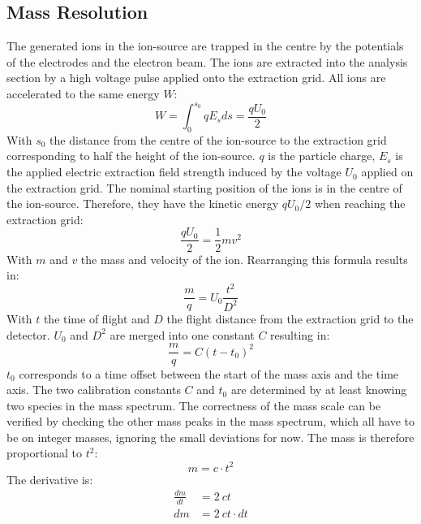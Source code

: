 	\subsection{Mass Resolution}\label{chap:massRes}
	The generated ions in the ion-source are trapped in the centre by the potentials of the electrodes and the electron beam. The ions are extracted into the analysis section by a high voltage pulse applied onto the extraction grid. All ions are accelerated to the same energy $W$:
	\begin{equation}
		W = \int_{0}^{s_0}q E_s ds =  \frac{q U_0}{2}
		\label{eq:WIonPulse}
	\end{equation}
	With $s_0$ the distance from the centre of the ion-source to the extraction grid corresponding to half the height of the ion-source. $q$ is the particle charge, $E_s$ is the applied electric extraction field strength induced by the voltage $U_0$ applied on the extraction grid. The nominal starting position of the ions is in the centre of the ion-source. Therefore, they have the kinetic energy $q U_0/2$ when reaching the extraction grid:
	\begin{equation}
		\frac{q U_0}{2} = \frac{1}{2}m v^2
	\end{equation}
	With $m$ and $v$ the mass and velocity of the ion. Rearranging this formula results in:
	\begin{equation}
		\frac{m}{q} = U_0\frac{t^2}{D^2}
		\label{eq:m/q}
	\end{equation}
	With $t$ the time of flight and $D$ the flight distance from the extraction grid to the detector. $U_0$ and $D^2$ are merged into one constant $C$ resulting in:
	\begin{equation}
		\frac{m}{q} = C(t-t_0)^2
		\label{eq:mass_Calib}
	\end{equation}
	$t_0$ corresponds to a time offset between the start of the mass axis and the time axis. The two calibration constants $C$ and $t_0$ are determined by at least knowing two species in the mass spectrum. The correctness of the mass scale can be verified by checking the other mass peaks in the mass spectrum, which all have to be on integer masses, ignoring the small deviations for now. The mass is therefore proportional to $t^2$:
	\begin{equation}
		m = c\cdot t^2
		\label{eq:mt2}
	\end{equation}
	The derivative is:
	\begin{align}
		\frac{dm}{dt} &= 2~ct\\
		dm &= 2~ct\cdot dt
		\label{eq:dm}
	\end{align}
